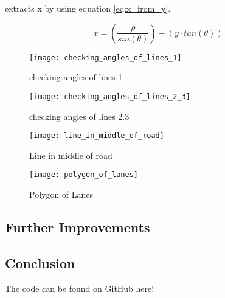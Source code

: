 \documentclass[conference]{IEEEtran}
\begin{document}
extracts x by using equation \ref{eq:x_from_y}.

\begin{equation} \label{eq:x_from_y}
x = \left(\frac{\rho}{sin(\theta)}\right) - (y \cdot tan(\theta))
\end{equation}

\begin{figure}[H]
\centerline{\texttt{[image: checking\_angles\_of\_lines\_1]}}
\caption{checking angles of lines 1}
\label{fig:checking_angles_of_lines_1}
\end{figure}

\begin{figure}[H]
\centerline{\texttt{[image: checking\_angles\_of\_lines\_2\_3]}}
\caption{checking angles of lines 2.3}
\label{fig:checking_angles_of_lines_2.3}
\end{figure}

\begin{figure}[H]
\centerline{\texttt{[image: line\_in\_middle\_of\_road]}}
\caption{Line in middle of road}
\label{fig:line_in_middle_of_road}
\end{figure}

\begin{figure}[H]
\centerline{\texttt{[image: polygon\_of\_lanes]}}
\caption{Polygon of Lanes}
\label{fig:polygon_of_lanes}
\end{figure}

\subsection{Further Improvements}

\subsection{Conclusion}




The code can be found on GitHub \href{https://github.com/LukeDWaller99/Aint308}{here!} 

\onecolumn

\begin{appendix}

\end{appendix}
\end{document}

